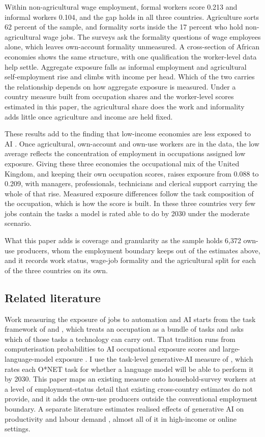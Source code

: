 Within non-agricultural wage employment, formal
workers score 0.213 and informal workers 0.104, and the gap holds in all three
countries. Agriculture sorts 62 percent of the
sample, and formality sorts inside the 17 percent who hold non-agricultural
wage jobs. The surveys ask the formality questions of wage employees alone,
which leaves own-account formality unmeasured.
A cross-section of African economies shows the same structure, with one
qualification the worker-level data help settle. Aggregate exposure falls as
informal employment and agricultural self-employment rise and climbs with income
per head. Which of the two carries the relationship depends on how aggregate
exposure is measured. Under a country measure built from occupation shares and
the worker-level scores estimated in this paper, the agricultural share does the work and
informality adds little once agriculture and income are held fixed.

These results add to the finding that low-income economies are less exposed to
AI \citep{pizzinelli2023,cazzaniga2024}. Once agricultural,
own-account and own-use workers are in the data, the low average reflects the
concentration of employment in occupations assigned low exposure. 
Giving these three economies the occupational mix
of the United Kingdom, and keeping their own occupation scores, raises exposure
from 0.088 to 0.209, with managers, professionals, technicians and clerical
support carrying the whole of that rise. Measured exposure differences follow
the task composition of the occupation, which is how the score is built. In
these three countries very few jobs contain the tasks a model is rated able to
do by 2030 under the moderate scenario.

What this paper adds is coverage and granularity as the sample holds 6,372
own-use producers, whom the employment boundary keeps out of the estimates
above, and it records work status, wage-job formality and the agricultural
split for each of the three countries on its own.

\subsection{Related literature}

Work measuring the exposure of jobs to automation and AI starts from the task
framework of \citet{autor2003} and \citet{acemoglu2019,acemoglu2022}, which
treats an occupation as a bundle of tasks and asks which of those tasks a
technology can carry out. That tradition runs from computerisation probabilities
\citep{frey2017} to AI occupational exposure scores \citep{felten2021,webb2020}
and large-language-model exposure \citep{eloundou2024}. I use the task-level
generative-AI measure of \citet{althoff2026}, which rates each O*NET task for
whether a language model will be able to perform it by 2030. This paper 
maps an existing measure onto household-survey
workers at a level of employment-status detail that existing cross-country
estimates do not provide, and it adds the own-use producers outside the
conventional employment boundary. A separate literature estimates realised effects of
generative AI on productivity and labour demand
\citep{brynjolfsson2023,noy2023,hui2023}, almost all of it in high-income or
online settings.

